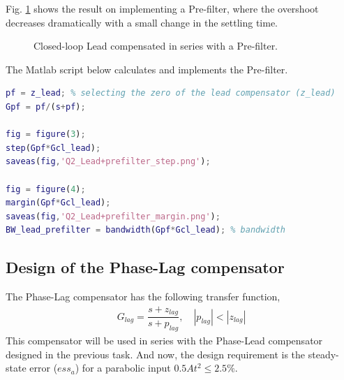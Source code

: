\documentclass[11pt, a4paper]{article}
\begin{document}
Fig. \ref{fig:Q2_lead+prefilter} shows the result on implementing a Pre-filter, where the overshoot decreases dramatically with a small change in the settling time.
\begin{figure}[H]
	\centering
	\caption{Closed-loop Lead compensated in series with a Pre-filter.}
	\label{fig:Q2_lead+prefilter}
\end{figure}

The Matlab script below calculates and implements the Pre-filter.
\begin{lstlisting}[language=matlab, caption={}, label={}]
%% Using prefilter to reduce the overshoot
pf = z_lead; % selecting the zero of the lead compensator (z_lead)
Gpf = pf/(s+pf);

fig = figure(3);
step(Gpf*Gcl_lead);
saveas(fig,'Q2_Lead+prefilter_step.png');

fig = figure(4);
margin(Gpf*Gcl_lead);
saveas(fig,'Q2_Lead+prefilter_margin.png');
BW_lead_prefilter = bandwidth(Gpf*Gcl_lead); % bandwidth
\end{lstlisting}
  
\subsection{Design of the Phase-Lag compensator}
The Phase-Lag compensator has the following transfer function,
\begin{align}
G_{lag} = \dfrac{s+z_{lag}}{s+p_{lag}}, \quad |p_{lag}|< |z_{lag}|
\end{align}
This compensator will be used in series with the Phase-Lead compensator designed in the previous task. And now, the design requirement is the steady-state error ($ess_a$) for a parabolic input $0.5At^2\leq2.5\%$.
\end{document}
